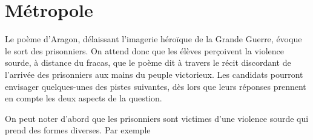 \section{Métropole}

{Le poème d'Aragon, délaissant l'imagerie héroïque de la Grande Guerre, évoque
le sort des prisonniers. On attend donc que les élèves perçoivent la violence sourde,
à distance du fracas, que le poème dit à travers le récit discordant de l'arrivée des
prisonniers aux mains du peuple victorieux. Les candidats pourront envisager
quelques-unes des pistes suivantes, dès lors que leurs réponses prennent en compte
les deux aspects de la question.

On peut noter d'abord que les prisonniers sont victimes d'une violence sourde qui
prend des formes diverses. Par exemple

}
